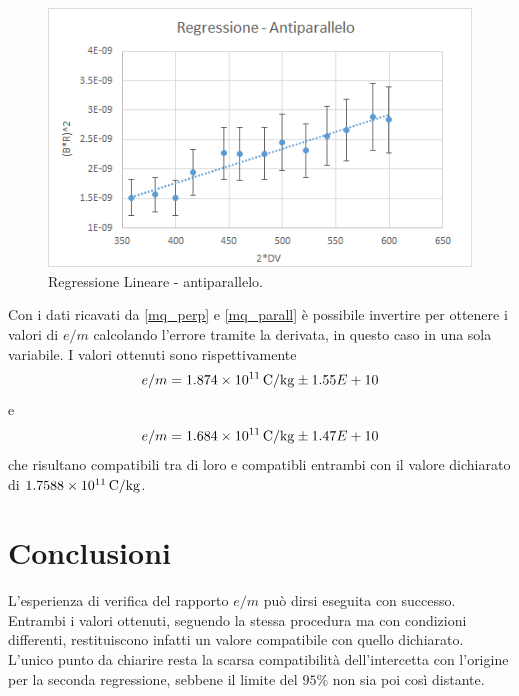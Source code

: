 \documentclass[a4paper,11pt]{article}
\begin{document}
		\begin{figure}[htpb]
			\centering
			\includegraphics[scale=1.25]{retta2}			%
			\caption{Regressione Lineare - antiparallelo.}\label{retta1}
		\end{figure}	
		
		Con i dati ricavati da \ref{mq_perp} e \ref{mq_parall} è possibile invertire per ottenere i valori di $e/m$ calcolando l'errore tramite la derivata, in questo caso in una sola variabile. I valori ottenuti sono rispettivamente
		\begin{equation}\label{em_perp}
		e/m = \SI{1.874E+11}{\coulomb/\kilogram} \pm 1.55E+10
		\end{equation}
		e 
		\begin{equation}\label{em_perp}
		e/m = \SI{1.684E+11}{\coulomb/\kilogram}\pm 1.47E+10
		\end{equation}
		che risultano compatibili tra di loro e compatibli entrambi con il valore dichiarato di $\SI{1.7588E+11}{\coulomb/\kilogram}$.
		
		\section{Conclusioni}
		L'esperienza di verifica del rapporto $e/m$ può dirsi eseguita con successo. Entrambi i valori ottenuti, seguendo la stessa procedura ma con condizioni differenti, restituiscono infatti un valore compatibile con quello dichiarato. L'unico punto da chiarire resta la scarsa compatibilità dell'intercetta con l'origine per la seconda regressione, sebbene il limite del $95\%$ non sia poi così distante. 
	
	
\end{document}
